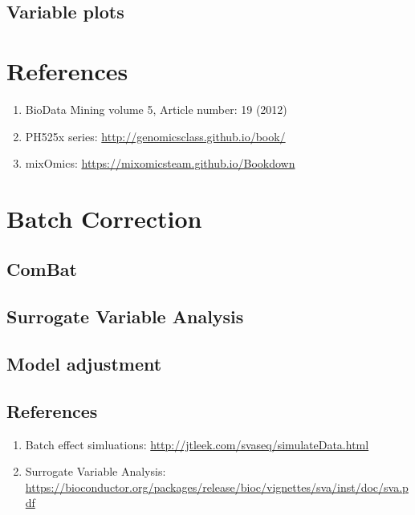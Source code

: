 \documentclass[]{book}
\providecommand{\tightlist}{%
  \setlength{\itemsep}{0pt}\setlength{\parskip}{0pt}}
\begin{document}
\section{Variable plots}\label{variable-plots}

\chapter{References}\label{references}

\begin{enumerate}
\def\labelenumi{\arabic{enumi}.}
\tightlist
\item
  BioData Mining volume 5, Article number: 19 (2012)\\
\item
  PH525x series: \url{http://genomicsclass.github.io/book/}
\item
  mixOmics: \url{https://mixomicsteam.github.io/Bookdown}
\end{enumerate}

\chapter{Batch Correction}\label{batch-correction}

\section{ComBat}\label{combat}

\section{Surrogate Variable Analysis}\label{surrogate-variable-analysis}

\section{Model adjustment}\label{model-adjustment}

\section{References}\label{references-1}

\begin{enumerate}
\def\labelenumi{\arabic{enumi}.}
\tightlist
\item
  Batch effect simluations:
  \url{http://jtleek.com/svaseq/simulateData.html}
\item
  Surrogate Variable Analysis:
  \url{https://bioconductor.org/packages/release/bioc/vignettes/sva/inst/doc/sva.pdf}
\end{enumerate}
\end{document}
